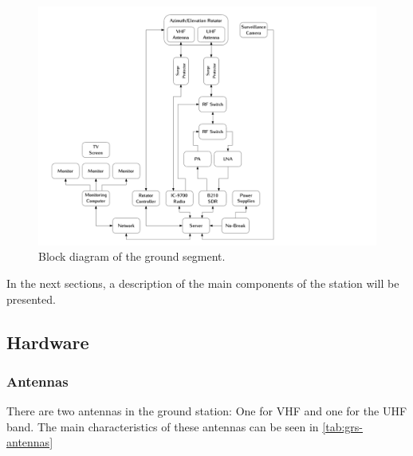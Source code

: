 \begin{figure}[!ht]
    \begin{center}
        \includegraphics[width=\textwidth]{figures/grs-block-diagram.pdf}
        \caption{Block diagram of the ground segment.}
        \label{fig:grs-block-diagram}
    \end{center}
\end{figure}

In the next sections, a description of the main components of the station will be presented.

\subsection{Hardware}

\subsubsection{Antennas}

There are two antennas in the ground station: One for VHF and one for the UHF band. The main characteristics of these antennas can be seen in \autoref{tab:grs-antennas}

